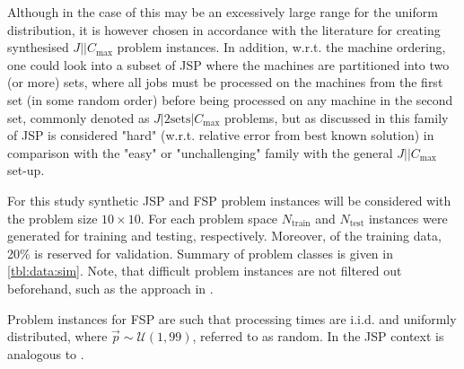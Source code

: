 \documentclass[smallextended]{svjour3}
\begin{document}
Although in the case of   this may be an excessively large range for 
the uniform distribution, it is however chosen in accordance with the 
literature \cite{Demirkol98} for creating synthesised $J||C_{\max}$ problem 
instances. In addition, w.r.t. the machine ordering, one could look into a 
subset of JSP where the machines are partitioned into two (or more) sets, where 
all jobs must be processed on the machines from the first set (in some random 
order) before being processed on any machine in the second set, commonly 
denoted as $J|2\textrm{sets}|C_{\max}$ problems, but as discussed in 
\cite{orlib_swv} this family of JSP is considered "hard" (w.r.t. relative error 
from best known solution) in comparison with the "easy" or "unchallenging" 
family with the general $J||C_{\max}$ set-up. %


For this study synthetic JSP and FSP problem instances will be considered with 
the problem size $10\times10$. 
For each problem space $N_{\text{train}}$  and $N_{\text{test}}$ instances were 
generated for training and testing, respectively. Moreover, of the training 
data, 20\% is reserved for validation.
Summary of problem classes is given in \cref{tbl:data:sim}.  
Note, that difficult problem instances are not filtered out beforehand, such as 
the approach in \cite{Whitley}. 



Problem instances for FSP are such that processing times are i.i.d. and 
uniformly distributed,   where $\vec{p}\sim\mathcal{U}(1,99)$, 
referred to as random. In the JSP context   is analogous to 
. 

\begin{table}\centering
  \caption[Problem space distributions used in experimental studies.]{Problem 
    space distributions used in experimental studies. Note, problem instances 
    are synthetic and each problem space is i.i.d. 
  }\label{tbl:data:sim}
  
\end{table} 
\end{document}
